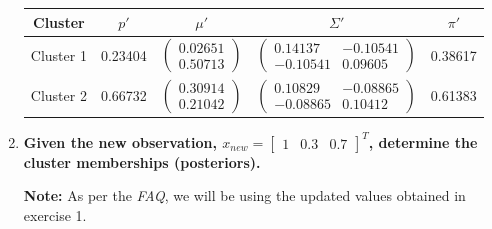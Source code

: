 \documentclass[12pt]{article}
\begin{document}
\begin{enumerate}[leftmargin=\labelsep]
          \begin{center}
              \captionsetup{type=table}
              \begin{tabular}{c|cccc}
                  Cluster & $p'$ & $\mu'$ & $\Sigma'$ & $\pi'$                              \\
                  \hline
                  \colorbox{bmint}{Cluster 1}                                               &
                  0.23404                                                                   &
                  $\begin{pmatrix} 0.02651 \\ 0.50713 \end{pmatrix}$                        &
                  $\begin{pmatrix} 0.14137 & -0.10541 \\ -0.10541 & 0.09605 \end{pmatrix}$  &
                  0.38617                                                                   \\
                  \colorbox{byellow}{Cluster 2}                                             &
                  0.66732                                                                   &
                  $\begin{pmatrix} 0.30914 \\ 0.21042 \end{pmatrix}$                        &
                  $\begin{pmatrix} 0.10829 & -0.08865 \\ -0.08865 & 0.10412 \end{pmatrix}$  &
                  0.61383                                                                   \\
              \end{tabular}
              \label{exI1-updated-params-table}
          \end{center}

    \item \textbf{Given the new observation, $x_{new} = \begin{bmatrix} 1 & 0.3 & 0.7 \end{bmatrix}^T$, determine the cluster memberships (posteriors).}

          \vskip 0.3cm
          \textbf{Note:} As per the \textit{FAQ}, we will be using the updated values obtained in exercise 1.


\end{enumerate}
\end{document}
